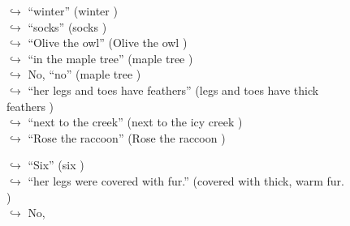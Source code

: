 \documentclass[11pt,a4paper, onecolumn]{article}
\begin{document}
\begin{figure}[t] \small \begin{tcolorbox}[boxsep=0pt,left=5pt,right=0pt,top=2pt,colback = yellow!5] \begin{dialogue}
 \small 
\colorbox{pink!25}{$\hookrightarrow$}
{ ``winter'' (winter ) }
\\
\colorbox{pink!25}{$\hookrightarrow$}
{ ``socks'' (socks ) }
\\
\colorbox{pink!25}{$\hookrightarrow$}
{ ``Olive the owl'' (Olive the owl ) }
\\
\colorbox{pink!25}{$\hookrightarrow$}
{ ``in the maple tree'' (maple tree ) }
\\
\colorbox{pink!25}{$\hookrightarrow$}
\colorbox{red!25}{No,}
{ ``no'' (maple tree ) }
\\
\colorbox{pink!25}{$\hookrightarrow$}
{ ``her legs and toes have feathers'' (legs and toes have thick feathers ) }
\\
\colorbox{pink!25}{$\hookrightarrow$}
{ ``next to the creek'' (next to the icy creek ) }
\\
\colorbox{pink!25}{$\hookrightarrow$}
{ ``Rose the raccoon'' (Rose the raccoon ) }
 \end{dialogue}\end{tcolorbox}\end{figure}\begin{figure}[t] \small \begin{tcolorbox}[boxsep=0pt,left=5pt,right=0pt,top=2pt,colback = yellow!5] \begin{dialogue}
 \small 
\colorbox{pink!25}{$\hookrightarrow$}
{ ``Six'' (six ) }
\\
\colorbox{pink!25}{$\hookrightarrow$}
{ ``her legs were covered with fur.'' (covered with thick, warm fur. ) }
\\
\colorbox{pink!25}{$\hookrightarrow$}
\colorbox{red!25}{No,}

\end{dialogue}
\end{tcolorbox}
\end{figure}
\end{document}
